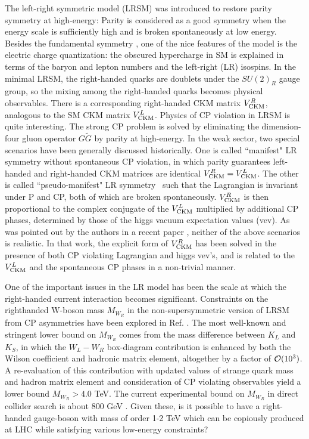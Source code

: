 \documentclass[prd,aps,preprint,tightenlines,superscriptaddress]{revtex4}
\begin{document}
The left-right symmetric model (LRSM) \cite{lrmodel} was introduced to restore parity
symmetry at high-energy: Parity is considered as a good symmetry when the energy scale is
sufficiently high and is broken spontaneously at low energy. Besides the fundamental
symmetry \cite{lee}, one of the nice features of the model is the electric charge
quantization: the obscured hypercharge in SM is explained in terms of the baryon and
lepton numbers and the left-right (LR) isospins. In the minimal LRSM, the
right-handed quarks are doublets under the $SU(2)_R$ gauge group, so the mixing among the
right-handed quarks becomes physical observables. There is a corresponding right-handed CKM matrix
$V^R_{\rm CKM}$, analogous to the SM CKM matrix $V^L_{\rm CKM}$. Physics of CP violation
in LRSM is quite interesting. The strong CP problem is solved by eliminating the
dimension-four gluon operator $G\tilde G$ by parity at high-energy. 
In the weak sector, two special scenarios have been generally discussed historically. 
One is called ``manifest" LR
symmetry without spontaneous CP violation, in which parity guarantees left-handed and
right-handed CKM matrices are identical $V^R_{\rm CKM}=V^L_{\rm CKM}$. The other is called
``pseudo-manifest" LR symmetry~\cite{scpv} such that the Lagrangian is invariant
under P and CP, both of which are broken spontaneously. $V^R_{\rm CKM}$ is then proportional
to the complex conjugate of the $V^L_{\rm CKM}$ multiplied by additional CP phases, determined by
those of the higgs vacuum expectation values (vev). As was pointed out by the
authors in a recent paper \cite{our paper}, neither of the above scenarios is realistic.
In that work, the explicit form of $V^R_{\rm CKM}$ has been solved in the presence of
both CP violating Lagrangian and higgs vev's, and is related to the $V^L_{\rm CKM}$ and the spontaneous CP
phases in a non-trivial manner.

One of the important issues in the LR model has been the scale at which the
right-handed current interaction becomes significant. Constraints on the righthanded
W-boson mass $M_{W_R}$ in the non-supersymmetric version of LRSM
from CP asymmetries have been explored in Ref. \cite{our paper}.
The most well-known and stringent lower bound on $M_{W_R}$ comes from the mass difference
between $K_L$ and $K_S$, in which the $W_L-W_R$ box-diagram contribution is enhanced by
both the Wilson coefficient and hadronic matrix element, altogether by a factor of ${\cal
O}(10^3)$. A re-evaluation of this contribution with updated values of strange quark mass
and hadron matrix element and consideration of CP violating observables yield
a lower bound $M_{W_R} > 4.0$ TeV. The current
experimental bound on $M_{W_R}$ in direct collider search is about 800 GeV \cite{PDG}.
Given these, is it possible to have a right-handed gauge-boson with mass of order 1-2 TeV 
which can be copiously produced at LHC while satisfying various low-energy constraints?
\end{document}

